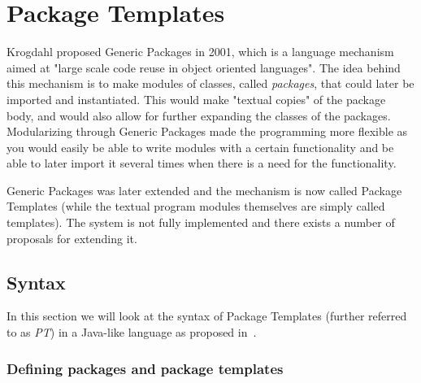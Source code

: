 \section{Package Templates}\label{sec:package-templates}


Krogdahl proposed Generic Packages in 2001, which is a language mechanism aimed at "large scale code reuse in object oriented languages"\cite{krogdahl:GP}.
The idea behind this mechanism is to make modules of classes, called \textit{packages}, that could later be imported and instantiated.
This would make "textual copies" of the package body, and would also allow for further expanding the classes of the packages.
Modularizing through Generic Packages made the programming more flexible as you would easily be able to write modules with a certain functionality and be able to later import it several times when there is a need for the functionality.

Generic Packages was later extended  and the mechanism is now called Package Templates (while the textual program modules themselves are simply called templates).
The system is not fully implemented and there exists a number of proposals for extending it.

\subsection{Syntax}\label{subsec:syntax}

In this section we will look at the syntax of Package Templates (further referred to as \emph{PT}) in a Java-like language as proposed in~\cite{jot}.

\subsubsection{Defining packages and package templates}

